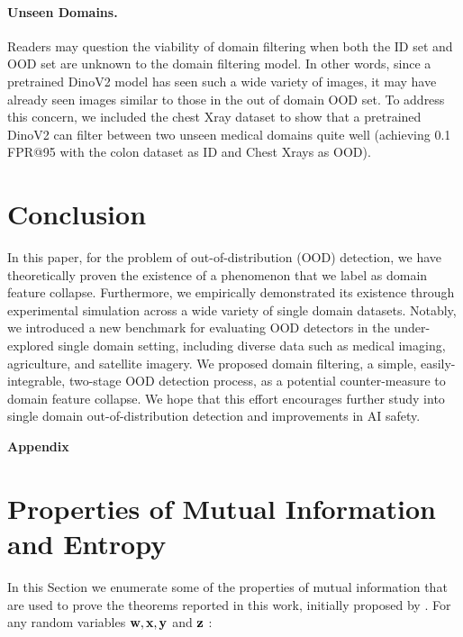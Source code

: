 \documentclass[letterpaper]{article} %
\theoremstyle{plain}
\theoremstyle{definition}
\theoremstyle{remark}
\newcommand\blankpage{%
    \null
    \thispagestyle{empty}%
    \addtocounter{page}{-1}%
    \newpage}
\begin{document}
\paragraph{Unseen Domains.} Readers may question the viability of domain filtering when both the ID set and OOD set are unknown to the domain filtering model. In other words, since a pretrained DinoV2 model has seen such a wide variety of images, it may have already seen images similar to those in the out of domain OOD set. To address this concern, we included the chest Xray dataset \citep{yang2023medmnist} to show that a pretrained DinoV2 can filter between two unseen medical domains quite well (achieving 0.1 FPR@95 with the colon dataset as ID and Chest Xrays as OOD). 

\section{Conclusion}
\label{sec:conclusion}

In this paper, for the problem of out-of-distribution (OOD) detection, we have theoretically proven the existence of a phenomenon that we label as domain feature collapse. Furthermore, we empirically demonstrated its existence through experimental simulation across a wide variety of single domain datasets. Notably, we introduced a new benchmark for evaluating  OOD detectors in the under-explored single domain setting, including diverse data such as medical imaging, agriculture, and satellite imagery. We proposed domain filtering, a simple, easily-integrable, two-stage OOD detection process, as a potential counter-measure to domain feature collapse. We hope that this effort encourages further study into single domain out-of-distribution detection and improvements in AI safety. 






\afterpage{\blankpage}
\newpage



\appendix

\begin{center}
    {\bf \LARGE Appendix}
\end{center}

\section{Properties of Mutual Information and Entropy}
\label{properties}
In this Section we enumerate some of the properties of mutual information that are used to prove the theorems reported in this work, initially proposed by \cite{shannon1948mathematical}. For any random variables ${\mathbf{w}}, {\mathbf{x}}, {\mathbf{y}}$ and ${\mathbf{z}}$ :
\end{document}
